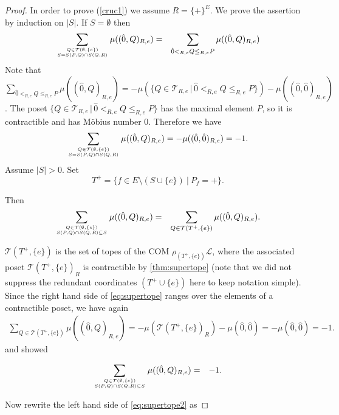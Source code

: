 \documentclass[12pt]{amsart}
\def\Tscr{{\mathcal T}}
\def\Lscr{{\mathcal L}}
\theoremstyle{plain}
\numberwithin{Lemma}{\DefaultNumberTheoremWithin}
\numberwithin{Claim}{\DefaultNumberTheoremWithin}
\numberwithin{Theorem}{\DefaultNumberTheoremWithin}
\numberwithin{Corollary}{\DefaultNumberTheoremWithin}
\numberwithin{Proposition}{\DefaultNumberTheoremWithin}
\numberwithin{Conjecture}{\DefaultNumberTheoremWithin}
\numberwithin{Situation}{\DefaultNumberTheoremWithin}
\numberwithin{Note}{\DefaultNumberTheoremWithin}
\theoremstyle{definition}
\numberwithin{Definition}{\DefaultNumberTheoremWithin}
\theoremstyle{definition}
\numberwithin{Question}{\DefaultNumberTheoremWithin}
\theoremstyle{definition}
\numberwithin{Problem}{\DefaultNumberTheoremWithin}
\theoremstyle{remark} \newtheorem{Remark}{Remark}
\numberwithin{Remark}{\DefaultNumberTheoremWithin}
\theoremstyle{remark}
\numberwithin{Example}{\DefaultNumberTheoremWithin}
\numberwithin{Case}{Lemma}
\numberwithin{Step}{Lemma}
\begin{document}
\begin{proof}
In order to prove (\ref{cruc1}) we assume $R = \{+\}^E$. We prove the assertion by induction on $|S|$.
  If $S = \emptyset$ then 
  \begin{eqnarray*} 
     \sum_{\genfrac{}{}{0pt}{}{Q \in \Tscr(\emptyset,\{e\})}{ S= S(P,Q) \cap S(Q,R)}}  \mu((\hat{0},Q)_{R,e}) & = & \sum_{\hat{0} <_{R,e} Q \leq_{R,e} P} \mu((\hat{0},Q)_{R,e}) 
\end{eqnarray*}
Note  that  $\sum_{\hat{0} <_{R,e} Q \leq_{R,e} P} \mu((\hat{0},Q)_{R,e}) = -\mu\left(\{Q \in \Tscr_{R,e}\,|\,\hat{0}<_{R,e} Q \leq_{R,e} P\}\right) -  \mu((\hat{0}, \hat{0})_{R,e})$. The poset $\{Q \in \Tscr_{R,e}\,|\,\hat{0}<_{R,e} Q \leq_{R,e} P\}$ has the maximal element $P$, so it is contractible and has M\"obius number $0$. Therefore we have
\begin{align*}
\sum_{\genfrac{}{}{0pt}{}{Q \in \Tscr(\emptyset,\{e\})}{ S= S(P,Q) \cap S(Q,R)}}  \mu((\hat{0},Q)_{R,e}) = -\mu((\hat{0}, \hat{0})_{R,e}) = -1.
\end{align*}
  Assume $|S| > 0$. 
  Set $$T^+ = \{ f\in E \setminus (S \cup \{e\})~|~P_f = +\}.$$
  
  Then 
  \begin{eqnarray} 
     \label{eq:supertope}
     \sum_{\genfrac{}{}{0pt}{}{Q \in \Tscr(\emptyset,\{e\})}{ S(P,Q) \cap S(Q,R) \subseteq S}}  \mu((\hat{0},Q)_{R,e}) & = & 
     \sum_{Q \in \Tscr(T^+,\{e\})} \mu((\hat{0},Q)_{R,e}). 
  \end{eqnarray}

  $\Tscr(T^+,\{e\})$ is the set of topes of the
  COM $\rho_{(T^+,\{e\})}\Lscr$, where the associated poset $\Tscr(T^+,\{e\})_R$ is contractible by \ref{thm:supertope} (note that we did not suppress the redundant coordinates $(T^+ \cup \{e\})$ here to keep notation simple).  Since the right
  hand side of \eqref{eq:supertope} ranges over the elements of a
  contractible poset, we have again
  \begin{align*}
  \sum_{Q \in \Tscr(T^+,\{e\})} \mu((\hat{0},Q)_{R,e}) = -\mu(\Tscr(T^+,\{e\})_R) -\mu(\hat{0},\hat{0}) = -\mu(\hat{0},\hat{0}) = -1.
  \end{align*}
  and showed

  \begin{eqnarray} 
     \label{eq:supertope2}
     \sum_{\genfrac{}{}{0pt}{}{Q \in \Tscr(\emptyset,\{e\})}{ S(P,Q) \cap S(Q,R) \subseteq S}}  \mu((\hat{0},Q)_{R,e}) & = & -1.
  \end{eqnarray}

  Now rewrite the left hand side of \eqref{eq:supertope2} as


\end{proof}
\end{document}

